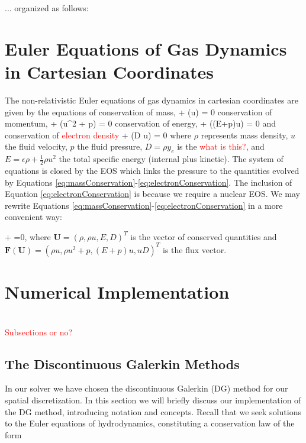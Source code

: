 \documentclass[onecolumn]{aastex62}
\begin{document}

... organized as follows:

\section{Euler Equations of Gas Dynamics in Cartesian Coordinates}
The non-relativistic Euler equations of gas dynamics
\citep[see, e.g.,][for details]{leveque:2002} in cartesian coordinates are given by
the equations of conservation of mass,
\beq
   + (\rho u) = 0
  \label{eq:massConservation}
\eeq
conservation of momentum,
\beq
	 + (\rho u^2 + p) = 0
  \label{eq:momentumConservation}
\eeq
conservation of energy,
\beq
   + ((E+p)u) = 0
  \label{eq:energyConservation}
\eeq
and conservation of \textcolor{red}{electron density}
\beq
   + (D u) = 0
  \label{eq:electronConservation}
\eeq
where $\rho$ represents mass density, $u$ the fluid velocity, $p$ the fluid
pressure, $D=\rho y_e$ is the \textcolor{red}{what is this?},
and $E=\epsilon \rho +\frac{1}{2}\rho u^2$ the total specific energy (internal plus kinetic).
The system of equations is closed by the EOS which links the pressure to
the quantities evolved by Equations
\eqref{eq:massConservation}-\eqref{eq:electronConservation}. The inclusion of
Equation \eqref{eq:electronConservation} is because we require a nuclear EOS.
We may rewrite Equations \eqref{eq:massConservation}-\eqref{eq:electronConservation}
in a more convenient way:

\beq
  +
  =0,
  \label{eq:conservation}
\eeq
where $\mathbf{U} =(\rho,\rho u,E, D)^{T}$ is the vector of conserved quantities
and $\mathbf{F}(\mathbf{U})=(\rho u,\rho u^{2}+p,(E+p)u, uD)^{T}$
is the flux vector.

\section{Numerical Implementation}
\label{DG}

 \\
\textcolor{red}{Subsections or no?}

\subsection{The Discontinuous Galerkin Methods}
In our solver we have chosen the discontinuous Galerkin (DG) method
for our spatial discretization. In this section we will briefly discuss our
implementation of the DG method, introducing notation and concepts. Recall that
we seek solutions to the Euler equations of hydrodynamics, constituting a
conservation law of the form
\end{document}
